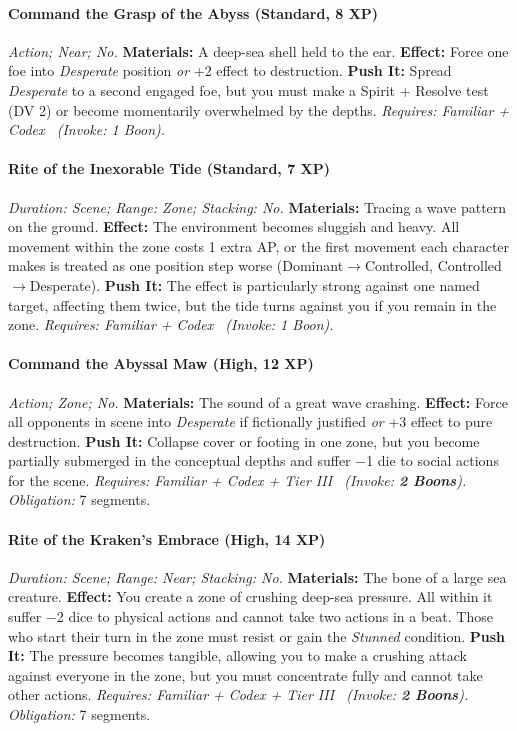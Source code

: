 \paragraph{Command the Grasp of the Abyss (Standard, 8 XP)} \emph{Action; Near; No.}
\textbf{Materials:} A deep-sea shell held to the ear.
\textbf{Effect:} Force one foe into \emph{Desperate} position \emph{or} +2 effect to destruction.
\textbf{Push It:} Spread \emph{Desperate} to a second engaged foe, but you must make a Spirit + Resolve test (DV 2) or become momentarily overwhelmed by the depths.
\emph{Requires: Familiar + Codex \ (\textit{Invoke:} 1 Boon).}
\paragraph{Rite of the Inexorable Tide (Standard, 7 XP)} \emph{Duration: Scene; Range: Zone; Stacking: No.}
\textbf{Materials:} Tracing a wave pattern on the ground.
\textbf{Effect:} The environment becomes sluggish and heavy. All movement within the zone costs 1 extra AP, or the first movement each character makes is treated as one position step worse (Dominant$\rightarrow$Controlled, Controlled$\rightarrow$Desperate).
\textbf{Push It:} The effect is particularly strong against one named target, affecting them twice, but the tide turns against you if you remain in the zone.
\emph{Requires: Familiar + Codex \ (\textit{Invoke:} 1 Boon).}
\paragraph{Command the Abyssal Maw (High, 12 XP)} \emph{Action; Zone; No.}
\textbf{Materials:} The sound of a great wave crashing.
\textbf{Effect:} Force all opponents in scene into \emph{Desperate} if fictionally justified \emph{or} +3 effect to pure destruction.
\textbf{Push It:} Collapse cover or footing in one zone, but you become partially submerged in the conceptual depths and suffer −1 die to social actions for the scene.
\emph{Requires: Familiar + Codex + Tier III \ (\textit{Invoke:} \textbf{2 Boons}).}
\emph{Obligation:} 7 segments.

\paragraph{Rite of the Kraken's Embrace (High, 14 XP)} \emph{Duration: Scene; Range: Near; Stacking: No.}
\textbf{Materials:} The bone of a large sea creature.
\textbf{Effect:} You create a zone of crushing deep-sea pressure. All within it suffer −2 dice to physical actions and cannot take two actions in a beat. Those who start their turn in the zone must resist or gain the \emph{Stunned} condition.
\textbf{Push It:} The pressure becomes tangible, allowing you to make a crushing attack against everyone in the zone, but you must concentrate fully and cannot take other actions.
\emph{Requires: Familiar + Codex + Tier III \ (\textit{Invoke:} \textbf{2 Boons}).}
\emph{Obligation:} 7 segments.

